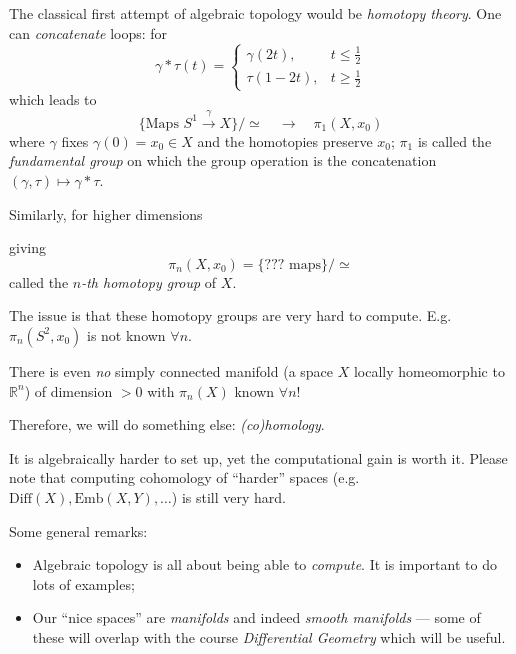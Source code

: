 \documentclass[a4paper,11pt]{article}
\begin{document}
	The classical first attempt of algebraic topology would be \emph{homotopy theory}. One can \emph{concatenate} loops:
	for
	\[
		\gamma * \tau (t) = \begin{cases}
			\gamma(2t),& t \leq \frac{1}{2}\\
			\tau(1 - 2t),& t \geq \frac{1}{2}
		\end{cases}
	\]
	which leads to
	\[
		\{\text{Maps }S^1 \xrightarrow{\gamma} X\} / \simeq \quad  \longrightarrow \quad \pi_1(X,x_0)
	\]
	where $\gamma$ fixes $\gamma(0) = x_0 \in X$ and the homotopies preserve $x_0$; 
	$\pi_1$ is called the \emph{fundamental group} on which the group operation is the concatenation $(\gamma, \tau) \mapsto \gamma * \tau$. 
	
	Similarly, for higher dimensions 

	giving
	\[
		\pi_n (X, x_0) = \{\text{??? maps}\} / \simeq
	\]
	called the \emph{$n$-th homotopy group} of $X$.

	The issue is that these homotopy groups are very hard to compute. E.g.\ $\pi_n (S^2, x_0)$ is not known $\forall n$.
	
	There is even \emph{no} simply connected manifold (a space $X$ locally homeomorphic to $\mathbb{R}^n$) of dimension $> 0$ with $\pi_n (X)$ known $\forall n$!
	
	Therefore, we will do something else: \emph{(co)homology}.

	It is algebraically harder to set up, yet the computational gain is worth it. Please note that computing cohomology of ``harder'' spaces (e.g.\ $\text{Diff}(X), \text{Emb}(X,Y), \dots$) is still very hard.

	Some general remarks:
	\begin{itemize}
		\item Algebraic topology is all about being able to \emph{compute}. It is important to do lots of examples;
		\item Our ``nice spaces'' are \emph{manifolds} and indeed \emph{smooth manifolds} --- some of these will overlap with the course \emph{Differential Geometry} which will be useful. 
	\end{itemize}
\end{document}
